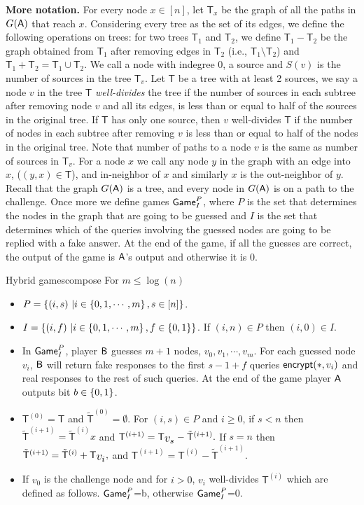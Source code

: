\documentclass{article}
\def\B{{\sf B}}
\def\A{{\sf A}}
\newcommand{\encrypt}{{\sf encrypt}}
\newcommand{\game}{{\sf Game}}
\newcommand{\T}{{\mathsf T}}
\newcommand{\gpi}{$\game^P_I$}
\newcommand{\dT}{{\mathsf{T}}}
\newcommand{\bigv}[1]{\mbox{\large $v_{#1}$}}
\newcommand{\bigt}[1]{{\dT}^{({#1})}}
\newcommand{\bigtb}[1]{\tilde{\dT}^{({#1})}}
\begin{document}
  \textbf{More notation.} For every node $x\in [n]$, let $\T_x$ be the graph of all the paths in $G(\A)$ that reach $x$. Considering every tree as the set of its edges, we define the following operations on trees: for two trees $\T_1$ and $\T_2$, we define $\T_1-\T_2$ be the graph obtained from $\T_1$ after removing edges in $\T_2$ (i.e., $ \T_1\setminus \T_2 $) and $\T_1+\T_2 = \T_1\cup \T_2$.  We call a node with indegree 0, a source and $S(v)$ is the number of sources in the tree $\T_v$.  Let $\T$ be a tree with at least 2 sources, we say a node $v$ in the tree $\T$ \textit{well-divides} the tree if the number of sources in each subtree after removing node $v$ and all its edges, is less than or equal to half of the sources in the original tree. If $\T$ has only one source, then $v$ well-divides $\T$ if the number of nodes in each subtree after removing $v$ is less than or equal to half of the nodes in the original tree. Note that number of paths to a node $v$ is the same as number of sources in $\T_v$. For a node $x$ we call any node $y$ in the graph with an edge into $x$, ($(y,x)\in \T$), and in-neighbor of $x$ and similarly $x$ is the out-neighbor of $y$.\\
  

  Recall that the graph $G(\A)$ is a tree, and every node in $G(\A)$ is on a path to the challenge. Once more we define games \gpi, where $P$ is the set that determines the nodes in the graph that are going to be guessed and $I$ is the set that determines which of the queries involving the guessed nodes are going to be replied with a fake answer. At the end of the game, if all the guesses are correct, the output of the game is $\A$'s output and otherwise it is 0.\\
\begin{boxfig}{Hybrid games}{compose}
For $m\leq \log (n)$
\begin{itemize}
  \item $P=\left\{ (i,s)\ | i \in \left\{ 0,1,\cdots,m \right\}, s\in [n] \right\} $.
  \item $I=\left\{ (i,f)\ | i \in \left\{ 0,1,\cdots,m \right\}, f\in \{0,1\} \right\}$. If $(i,n)\in P$ then $(i,0) \in I$. 
  \item In \gpi, player $\B$ guesses $m+1$ nodes, $v_0,v_1,\cdots,v_m$. For each guessed node $v_i$, $\B$ will return fake responses to the first $s-1+f$ queries $\encrypt(*,v_i)$ and real responses to the rest of such queries. At the end of the game player $\A$ outputs bit $b\in \{0,1\}$.
 \item $\bigt{0}=\T$ and $\bigtb{0}=\emptyset$. For $(i,s)\in P$ and $i\geq 0$, if $s<n$ then $\bigtb{i+1}=\bigtb{i}x$ and $\bigt{i+1}=\T_{\bigv{s}}-\bigtb{i+1}.$ If $s=n$ then $\bigtb{i+1}=\bigtb{i}+\T_{\bigv{i}},$ and $\bigt{i+1}=\bigt{i}- \bigtb{i+1}.$
\item If $v_0$ is the challenge node and for $i>0$, $v_i$ well-divides $\bigt{i}$ which are defined as follows. \gpi=b, otherwise \gpi=0. 
\end{itemize}
\end{boxfig}
\end{document}
